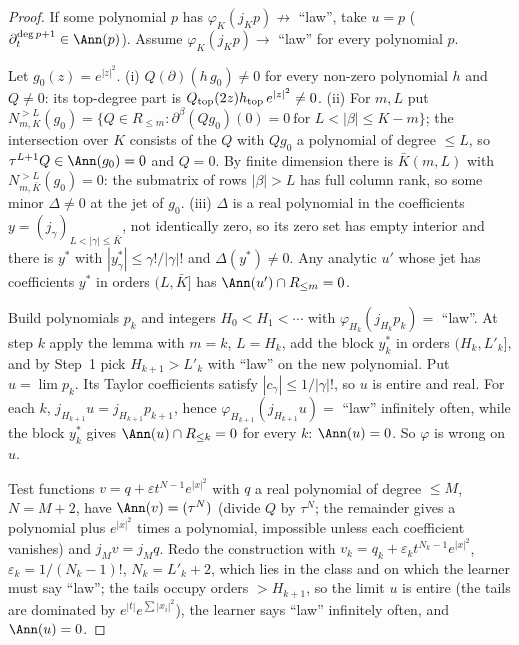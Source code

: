 \begin{proof}
If some polynomial $p$ has $\varphi_K(j_Kp)\not\to$ ``law'', take $u=p$ ($\partial_t^{\deg p+1}\in\Ann(p)$). Assume $\varphi_K(j_Kp)\to$ ``law'' for every polynomial $p$.

Let $g_0(z)=e^{|z|^2}$. (i) $Q(\partial)(h\,g_0)\ne0$ for every non-zero polynomial $h$ and $Q\ne0$: its top-degree part is $Q_{\rm top}(2z)h_{\rm top}\,e^{|z|^2}\ne0$. (ii) For $m,L$ put $N^{>L}_{m,K}(g_0)=\{Q\in R_{\le m}:\partial^\beta(Qg_0)(0)=0\ \text{for }L<|\beta|\le K-m\}$; the intersection over $K$ consists of the $Q$ with $Qg_0$ a polynomial of degree $\le L$, so $\tau^{L+1}Q\in\Ann(g_0)=0$ and $Q=0$. By finite dimension there is $\bar K(m,L)$ with $N^{>L}_{m,\bar K}(g_0)=0$: the submatrix of rows $|\beta|>L$ has full column rank, so some minor $\Delta\ne0$ at the jet of $g_0$. (iii) $\Delta$ is a real polynomial in the coefficients $y=(j_\gamma)_{L<|\gamma|\le\bar K}$, not identically zero, so its zero set has empty interior and there is $y^*$ with $|y^*_\gamma|\le\gamma!/|\gamma|!$ and $\Delta(y^*)\ne0$. Any analytic $u'$ whose jet has coefficients $y^*$ in orders $(L,\bar K]$ has $\Ann(u')\cap R_{\le m}=0$.

Build polynomials $p_k$ and integers $H_0<H_1<\cdots$ with $\varphi_{H_k}(j_{H_k}p_k)=$ ``law''. At step $k$ apply the lemma with $m=k$, $L=H_k$, add the block $y^*_k$ in orders $(H_k,L'_k]$, and by Step~1 pick $H_{k+1}>L'_k$ with ``law'' on the new polynomial. Put $u=\lim p_k$. Its Taylor coefficients satisfy $|c_\gamma|\le1/|\gamma|!$, so $u$ is entire and real. For each $k$, $j_{H_{k+1}}u=j_{H_{k+1}}p_{k+1}$, hence $\varphi_{H_{k+1}}(j_{H_{k+1}}u)=$ ``law'' infinitely often, while the block $y^*_k$ gives $\Ann(u)\cap R_{\le k}=0$ for every $k$: $\Ann(u)=0$. So $\varphi$ is wrong on $u$.

Test functions $v=q+\varepsilon t^{N-1}e^{|x|^2}$ with $q$ a real polynomial of degree $\le M$, $N=M+2$, have $\Ann(v)=(\tau^N)$ (divide $Q$ by $\tau^N$; the remainder gives a polynomial plus $e^{|x|^2}$ times a polynomial, impossible unless each coefficient vanishes) and $j_Mv=j_Mq$. Redo the construction with $v_k=q_k+\varepsilon_kt^{N_k-1}e^{|x|^2}$, $\varepsilon_k=1/(N_k-1)!$, $N_k=L'_k+2$, which lies in the class and on which the learner must say ``law''; the tails occupy orders $>H_{k+1}$, so the limit $u$ is entire (the tails are dominated by $e^{|t|}e^{\sum|x_i|^2}$), the learner says ``law'' infinitely often, and $\Ann(u)=0$.

\end{proof}

